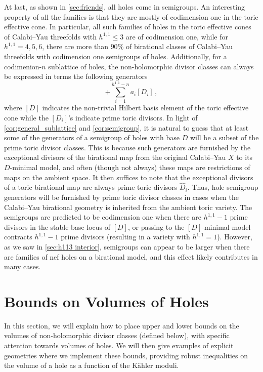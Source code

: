 \documentclass[11pt,dvipsnames]{article}
\theoremstyle{definition}
\begin{document}
At last, as shown in \cref{sec:friends}, all holes come in semigroups. An interesting property of all the families is that they are mostly of codimension one in the toric effective cone. In particular, all such families of holes in the toric effective cones of Calabi--Yau threefolds with $h^{1,1}\leq 3$ are of codimension one, while for $h^{1,1}=4,5,6$, there are more than $90\%$ of birational classes of Calabi--Yau threefolds with codimension one semigroups of holes.
Additionally, for a codimenion-$n$ sublattice of holes, the non-holomorphic divisor classes can always be expressed in terms the following generators
\begin{equation}
    [D] + \sum_{i=1}^{h^{1,1}-n} a_i [D_i] \,,
\end{equation}
where $[D]$ indicates the non-trivial Hilbert basis element of the toric effective cone while the $[D_i]$'s indicate prime toric divisors. In light of \cref{cor:general_sublattice} and \cref{cor:semigroup}, it is natural to guess that at least some of the generators of a semigroup of holes with base $D$ will be a subset of the prime toric divisor classes. This is because such generators are furnished by the exceptional divisors of the birational map from the original Calabi--Yau $X$ to its $D$-minimal model, and often (though not always) these maps are restrictions of maps on the ambient space. It then suffices to note that the exceptional divisors of a toric birational map are always prime toric divisors $\hat{D}_i$. Thus, hole semigroup generators will be furnished by prime toric divisor classes in cases when the Calabi--Yau birational geometry is inherited from the ambient toric variety. The semigroups are predicted to be codimension one when there are $h^{1,1} - 1$ prime divisors in the stable base locus of $[D]$, or passing to the $[D]$-minimal model contracts $h^{1,1} - 1$ prime divisors (resulting in a variety with $h^{1,1} = 1$). However, as we saw in \cref{sec:h113 interior}, semigroups can appear to be larger when there are families of nef holes on a birational model, and this effect likely contributes in many cases.

\section{Bounds on Volumes of Holes} \label{sec:vol_bounds}
In this section, we will explain how to place upper and lower bounds on the volumes of non-holomorphic divisor classes (defined below), with specific attention towards volumes of holes. We will then give examples of explicit geometries where we implement these bounds, providing robust inequalities on the volume of a hole as a function of the K\"ahler moduli.
\end{document}
